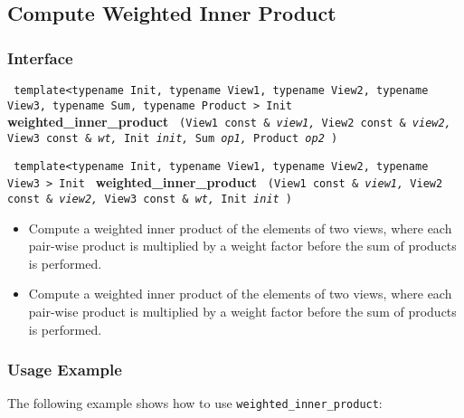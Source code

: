 \subsection{Compute Weighted Inner Product} \label{sec-num-wt_inner}

\subsubsection{Interface} %

\noindent
\texttt{%
template<typename Init, typename View1, typename View2, typename View3, 
     typename Sum, typename Product >
\newline
Init 
}
\newline
\textbf{weighted\_inner\_product}%
\texttt{%
(View1 const \&
\textit{view1,}%
View2 const \&
\textit{view2,}%
View3 const \&
\textit{wt,}%
Init 
\textit{init,}%
Sum 
\textit{op1,}%
Product 
\textit{op2}%
)
}
\vspace{0.4cm}

\noindent
\texttt{%
template<typename Init, typename View1, typename View2, typename View3 >
\newline
Init 
}
\newline
\textbf{weighted\_inner\_product}%
\texttt{%
(View1 const \&
\textit{view1,}%
View2 const \&
\textit{view2,}%
View3 const \&
\textit{wt,}%
Init 
\textit{init}%
)
}

\begin{itemize}
\item
Compute a weighted inner product of the elements of two views, where each pair-wise product is multiplied by a weight factor before the sum of products is performed. 
\item
Compute a weighted inner product of the elements of two views, where each pair-wise product is multiplied by a weight factor before the sum of products is performed. 
\end{itemize}

\subsubsection{Usage Example} %

The following example shows how to use \texttt{weighted\_inner\_product}:

 
